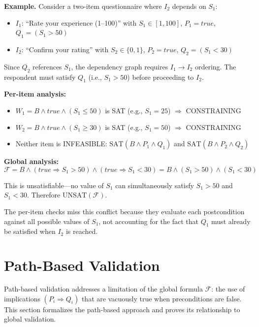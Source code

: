 \begin{mdframed}
\noindent\textbf{Example.} Consider a two-item questionnaire where $I_2$ depends on $S_1$:
\begin{itemize}
    \item $I_1$: ``Rate your experience (1--100)'' with $S_1 \in [1, 100]$, $P_1 = \mathit{true}$, $Q_1 = (S_1 > 50)$
    \item $I_2$: ``Confirm your rating'' with $S_2 \in \{0, 1\}$, $P_2 = \mathit{true}$, $Q_2 = (S_1 < 30)$
\end{itemize}

Since $Q_2$ references $S_1$, the dependency graph requires $I_1 \to I_2$ ordering. The respondent must satisfy $Q_1$ (i.e., $S_1 > 50$) before proceeding to $I_2$.

\textbf{Per-item analysis:}
\begin{itemize}
    \item $W_1 = B \wedge \mathit{true} \wedge (S_1 \leq 50)$ is SAT (e.g., $S_1 = 25$) $\Rightarrow$ CONSTRAINING
    \item $W_2 = B \wedge \mathit{true} \wedge (S_1 \geq 30)$ is SAT (e.g., $S_1 = 50$) $\Rightarrow$ CONSTRAINING
    \item Neither item is INFEASIBLE: $\mathrm{SAT}(B \wedge P_1 \wedge Q_1)$ and $\mathrm{SAT}(B \wedge P_2 \wedge Q_2)$
\end{itemize}

\textbf{Global analysis:}
\[
\mathcal{F} = B \wedge (\mathit{true} \Rightarrow S_1 > 50) \wedge (\mathit{true} \Rightarrow S_1 < 30) = B \wedge (S_1 > 50) \wedge (S_1 < 30)
\]

This is unsatisfiable—no value of $S_1$ can simultaneously satisfy $S_1 > 50$ and $S_1 < 30$. Therefore $\mathrm{UNSAT}(\mathcal{F})$.

The per-item checks miss this conflict because they evaluate each postcondition against all possible values of $S_1$, not accounting for the fact that $Q_1$ must already be satisfied when $I_2$ is reached.
\end{mdframed}

\section{Path-Based Validation}

Path-based validation addresses a limitation of the global formula $\mathcal{F}$: the use of implications $(P_i \Rightarrow Q_i)$ that are vacuously true when preconditions are false. This section formalizes the path-based approach and proves its relationship to global validation.

